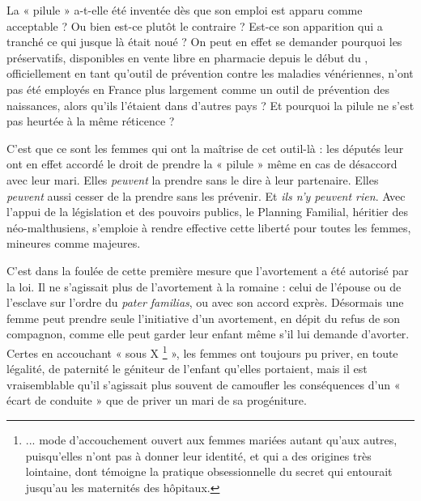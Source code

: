  La « pilule » a-t-elle été inventée dès que son emploi est apparu comme acceptable ? Ou bien est-ce plutôt le contraire ? Est-ce son apparition qui a tranché ce qui jusque là était noué ? On peut en effet se demander pourquoi les préservatifs, disponibles en vente libre en pharmacie depuis le début du , officiellement en tant qu'outil de prévention contre les maladies vénériennes, n'ont pas été employés en France plus largement comme un outil de prévention des naissances, alors qu'ils l'étaient dans d'autres pays ? Et pourquoi la pilule ne s'est pas heurtée à la même réticence ? 

 C'est que ce sont les femmes qui ont la maîtrise de cet outil-là : les députés leur ont en effet accordé le droit de prendre la « pilule » même en cas de désaccord avec leur mari. Elles \emph{peuvent} la prendre sans le dire à leur partenaire. Elles \emph{peuvent} aussi cesser de la prendre sans les prévenir. Et\emph{ ils n'y peuvent rien}. Avec l'appui de la législation et des pouvoirs publics, le Planning Familial, héritier des néo-malthusiens, s'emploie à rendre effective cette liberté pour toutes les femmes, mineures comme majeures. 

 C'est dans la foulée de cette première mesure que l'avortement a été autorisé par la loi. Il ne s'agissait plus de l'avortement à la romaine : celui de l'épouse ou de l'esclave sur l'ordre du \emph{pater familias}, ou avec son accord exprès. Désormais une femme peut prendre seule l'initiative d'un avortement, en dépit du refus de son compagnon, comme elle peut garder leur enfant même s'il lui demande d'avorter. Certes en accouchant « sous X%
\footnote{... mode d'accouchement ouvert aux femmes mariées autant qu'aux autres, puisqu'elles n'ont pas à donner leur identité, et qui a des origines très lointaine, dont témoigne la pratique obsessionnelle du secret qui entourait jusqu'au  les maternités des hôpitaux.}
 », les femmes ont toujours pu priver, en toute légalité, de paternité le géniteur de l'enfant qu'elles portaient, mais il est vraisemblable qu'il s'agissait plus souvent de camoufler les conséquences d'un « écart de conduite » que de priver un mari de sa progéniture.


